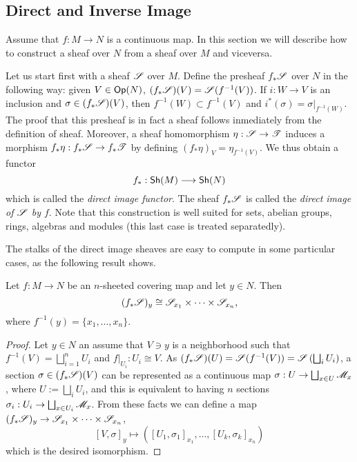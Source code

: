 \subsection{Direct and Inverse Image}

Assume that $f:M\to N$ is a continuous map. In this section we will describe how to construct a sheaf over $N$ from a sheaf over $M$ and viceversa.

Let us start first with a sheaf $\mathscr{S}$ over $M$. Define the presheaf $f_*\mathscr{S}$ over $N$ in the following way: given $V\in \mathsf{Op}(N)$, $(f_*\mathscr{S})(V)=\mathscr{S}(f^{-1}(V))$. If $i:W\to V$ is an inclusion and $\sigma \in (f_*\mathscr{S})(V)$, then $f^{-1}(W)\subset f^{-1}(V)$ and $i^*(\sigma )=\sigma |_{f^{-1}(W)}$. The proof that this presheaf is in fact a sheaf follows inmediately from the definition of sheaf. Moreover, a sheaf homomorphism $\eta :\mathscr{S}\to \mathscr{T}$ induces a morphism $f_*\eta :f_*\mathscr{S}\to f_*\mathscr{T}$ by defining $(f_*\eta )_V=\eta_{f^{-1}(V)}$. We thus obtain a functor
$$f_*:\mathsf{Sh}(M)\longrightarrow \mathsf{Sh}(N)$$
which is called the \emph{direct image functor}. The sheaf $f_*\mathscr{S}$ is called the \emph{direct image of $\mathscr{S}$ by $f$}. Note that this construction is well suited for sets, abelian groups, rings, algebras and modules (this last case is treated separatedly).

The stalks of the direct image sheaves are easy to compute in some particular cases, as the following result shows.

\begin{proposition}\label{direct_covering}
Let $f:M\to N$ be an $n$-sheeted covering map and let $y\in N$. Then
$$(f_*\mathscr{S})_y\cong  \mathscr{S}_{x_1}\times \cdots \times \mathscr{S}_{x_n},$$
where $f^{-1}(y)=\{x_1,\dots ,x_n\}$.
\end{proposition}
\begin{proof}
Let $y\in N$ an assume that $V\ni y$ is a neighborhood such that $f^{-1}(V)=\bigsqcup_{i=1}^nU_i$ and $f|_{U_i}:U_i\cong V$. As $(f_*\mathscr{S})(U)=\mathscr{S}(f^{-1}(V))=\mathscr{S}\left (\bigsqcup_iU_i\right )$, a section $\sigma \in (f_*\mathscr{S})(V)$ can be represented as a continuous map $\sigma :U\to \bigsqcup_{x\in U}\mathscr{M}_x$, where $U:=\bigsqcup_iU_i$, and this is equivalent to having $n$ sections $\sigma_i:U_i\to \bigsqcup_{x\in U_i}\mathscr{M}_x$. From these facts we can define a map $(f_*\mathscr{S})_y\to \mathscr{S}_{x_1}\times \cdots \times \mathscr{S}_{x_n}$,
$$[V,\sigma ]_y\longmapsto ([U_1,\sigma_1]_{x_1},\dots ,[U_k,\sigma_k]_{x_n})$$
which is the desired isomorphism.
\end{proof}

